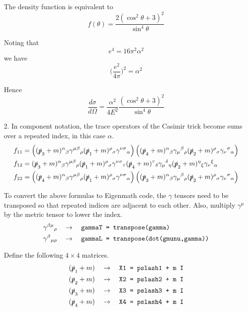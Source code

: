 \documentclass[12pt]{article}
\begin{document}
The density function is equivalent to
\begin{equation*}
f(\theta)=\frac{2(\cos^2\theta+3)^2}{\sin^4\theta}
\end{equation*}

Noting that
\begin{equation*}
e^4=16\pi^2\alpha^2
\end{equation*}
we have
\begin{equation*}
\bigg(\frac{e^2}{4\pi}\bigg)^2=\alpha^2
\end{equation*}

Hence
\begin{equation*}
\frac{d\sigma}{d\Omega}=\frac{\alpha^2}{4E^2}\frac{(\cos^2\theta+3)^2}{\sin^4\theta}
\end{equation*}

2. In component notation, the trace operators of the Casimir trick become sums over
a repeated index, in this case $\alpha$.
\begin{align*}
f_{11}&=
\left(
(\slashed{p}_3+m)^\alpha{}_\beta
\gamma^{\mu\beta}{}_\rho
(\slashed{p}_1+m)^\rho{}_\sigma
\gamma^{\nu\sigma}{}_\alpha
\right)
\left(
(\slashed{p}_4+m)^\alpha{}_\beta
\gamma_\mu{}^\beta{}_\rho
(\slashed{p}_2+m)^\rho{}_\sigma
\gamma_\nu{}^\sigma{}_\alpha
\right)
\\
f_{12}&=
(\slashed{p}_3+m)^\alpha{}_\beta
\gamma^{\mu\beta}{}_\rho
(\slashed{p}_1+m)^\rho{}_\sigma
\gamma^{\nu\sigma}{}_\tau
(\slashed{p}_4+m)^\tau{}_\delta
\gamma_\mu{}^\delta{}_\eta
(\slashed{p}_2+m)^\eta{}_\xi
\gamma_\nu{}^\xi{}_\alpha
\\
f_{22}&=
\left(
(\slashed{p}_4+m)^\alpha{}_\beta
\gamma^{\mu\beta}{}_\rho
(\slashed{p}_1+m)^\rho{}_\sigma
\gamma^{\nu\sigma}{}_\alpha
\right)
\left(
(\slashed{p}_3+m)^\alpha{}_\beta
\gamma_\mu{}^\beta{}_\rho
(\slashed{p}_2+m)^\rho{}_\sigma
\gamma_\nu{}^\sigma{}_\alpha
\right)
\end{align*}

To convert the above formulas to Eigenmath code,
the $\gamma$ tensors need to be transposed
so that repeated indices are adjacent to each other.
Also, multiply $\gamma^\mu$ by the metric tensor to lower the index.
\begin{align*}
\gamma^{\beta\mu}{}_\rho\quad&\rightarrow\quad
\text{\tt gammaT = transpose(gamma)}\\
\gamma^\beta{}_{\mu\rho}\quad&\rightarrow\quad
\text{\tt gammaL = transpose(dot(gmunu,gamma))}
\end{align*}

Define the following $4\times4$ matrices.
\begin{align*}
(\slashed{p}_1+m)\quad&\rightarrow\quad\text{\tt X1 = pslash1 + m I}\\
(\slashed{p}_2+m)\quad&\rightarrow\quad\text{\tt X2 = pslash2 + m I}\\
(\slashed{p}_3+m)\quad&\rightarrow\quad\text{\tt X3 = pslash3 + m I}\\
(\slashed{p}_4+m)\quad&\rightarrow\quad\text{\tt X4 = pslash4 + m I}
\end{align*}
\end{document}

